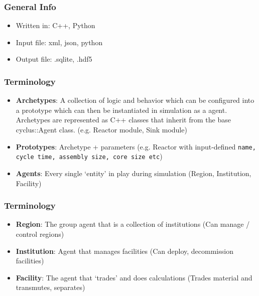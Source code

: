 \begin{frame}
	\frametitle{General Info}
	\begin{itemize}
		\item Written in: C++, Python
		\item Input file: xml, json, python
		\item Output file: .sqlite, .hdf5
	\end{itemize}
\end{frame}


\begin{frame}
	\frametitle{Terminology}
	\begin{itemize}
		\item \textbf{Archetypes}: A collection of logic and behavior which can be configured into a prototype which can then be instantiated in simulation as a agent. Archetypes are represented as C++ classes that inherit from the base cyclus::Agent class. (e.g. Reactor module, Sink module)
		\item \textbf{Prototypes}: Archetype + parameters (e.g. Reactor with input-defined  \texttt{name, cycle time, assembly size, core size etc})
		\item \textbf{Agents}: Every single `entity' in play during simulation (Region, Institution, Facility)
	\end{itemize}
\end{frame}

\begin{frame}
	\frametitle{Terminology}
	\begin{itemize}
		\item \textbf{Region}: The group agent that is a collection of institutions (Can manage / control regions)
		\item \textbf{Institution}: Agent that manages facilities (Can deploy, decommission facilities)
		\item \textbf{Facility}: The agent that `trades' and does calculations (Trades material and transmutes, separates)
	\end{itemize}
\end{frame}

